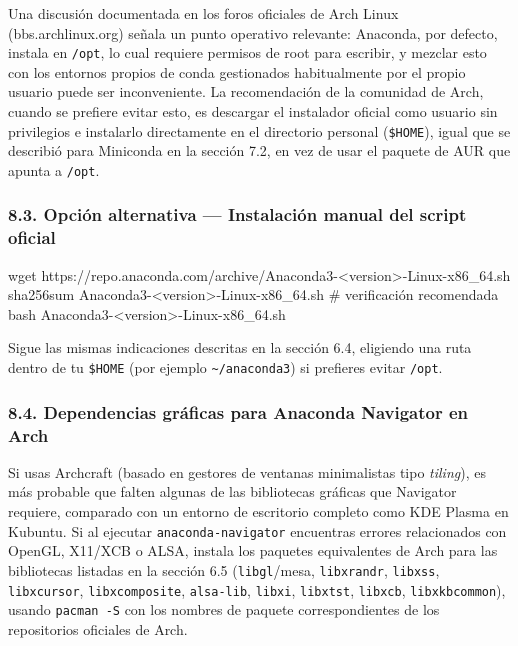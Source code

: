 \documentclass[
  doc,
  floatsintext,
  longtable,
  a4paper,
  nolmodern,
  notxfonts,
  notimes,
  12pt,
  colorlinks=true,linkcolor=blue,citecolor=blue,urlcolor=blue]{apa7}
\newenvironment{Shaded}{\begin{snugshade}}{\end{snugshade}}
\newcommand{\CommentTok}[1]{\textcolor[rgb]{0.37,0.37,0.37}{#1}}
\newcommand{\FunctionTok}[1]{\textcolor[rgb]{0.28,0.35,0.67}{#1}}
\newcommand{\NormalTok}[1]{\textcolor[rgb]{0.00,0.23,0.31}{#1}}
\newcommand{\OperatorTok}[1]{\textcolor[rgb]{0.37,0.37,0.37}{#1}}
\begin{document}
Una discusión documentada en los foros oficiales de Arch Linux
(bbs.archlinux.org) señala un punto operativo relevante: Anaconda, por
defecto, instala en \texttt{/opt}, lo cual requiere permisos de root
para escribir, y mezclar esto con los entornos propios de conda
gestionados habitualmente por el propio usuario puede ser inconveniente.
La recomendación de la comunidad de Arch, cuando se prefiere evitar
esto, es descargar el instalador oficial como usuario sin privilegios e
instalarlo directamente en el directorio personal (\texttt{\$HOME}),
igual que se describió para Miniconda en la sección 7.2, en vez de usar
el paquete de AUR que apunta a \texttt{/opt}.

\subsubsection{8.3. Opción alternativa --- Instalación manual del script
oficial}\label{opciuxf3n-alternativa-instalaciuxf3n-manual-del-script-oficial}

\begin{Shaded}
\begin{Highlighting}[]
\FunctionTok{wget}\NormalTok{ https://repo.anaconda.com/archive/Anaconda3{-}}\OperatorTok{\textless{}}\NormalTok{version}\OperatorTok{\textgreater{}}\NormalTok{{-}Linux{-}x86\_64.sh}
\FunctionTok{sha256sum}\NormalTok{ Anaconda3{-}}\OperatorTok{\textless{}}\NormalTok{version}\OperatorTok{\textgreater{}}\NormalTok{{-}Linux{-}x86\_64.sh   }\CommentTok{\# verificación recomendada}
\FunctionTok{bash}\NormalTok{ Anaconda3{-}}\OperatorTok{\textless{}}\NormalTok{version}\OperatorTok{\textgreater{}}\NormalTok{{-}Linux{-}x86\_64.sh}
\end{Highlighting}
\end{Shaded}

Sigue las mismas indicaciones descritas en la sección 6.4, eligiendo una
ruta dentro de tu \texttt{\$HOME} (por ejemplo
\texttt{\textasciitilde{}/anaconda3}) si prefieres evitar \texttt{/opt}.

\subsubsection{8.4. Dependencias gráficas para Anaconda Navigator en
Arch}\label{dependencias-gruxe1ficas-para-anaconda-navigator-en-arch}

Si usas Archcraft (basado en gestores de ventanas minimalistas tipo
\emph{tiling}), es más probable que falten algunas de las bibliotecas
gráficas que Navigator requiere, comparado con un entorno de escritorio
completo como KDE Plasma en Kubuntu. Si al ejecutar
\texttt{anaconda-navigator} encuentras errores relacionados con OpenGL,
X11/XCB o ALSA, instala los paquetes equivalentes de Arch para las
bibliotecas listadas en la sección 6.5 (\texttt{libgl}/mesa,
\texttt{libxrandr}, \texttt{libxss}, \texttt{libxcursor},
\texttt{libxcomposite}, \texttt{alsa-lib}, \texttt{libxi},
\texttt{libxtst}, \texttt{libxcb}, \texttt{libxkbcommon}), usando
\texttt{pacman\ -S} con los nombres de paquete correspondientes de los
repositorios oficiales de Arch.
\end{document}
